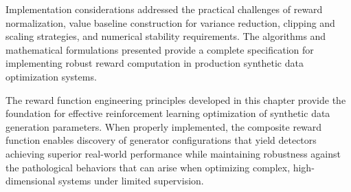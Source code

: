Implementation considerations addressed the practical challenges of reward normalization, value baseline construction for variance reduction, clipping and scaling strategies, and numerical stability requirements. The algorithms and mathematical formulations presented provide a complete specification for implementing robust reward computation in production synthetic data optimization systems.

The reward function engineering principles developed in this chapter provide the foundation for effective reinforcement learning optimization of synthetic data generation parameters. When properly implemented, the composite reward function enables discovery of generator configurations that yield detectors achieving superior real-world performance while maintaining robustness against the pathological behaviors that can arise when optimizing complex, high-dimensional systems under limited supervision.
